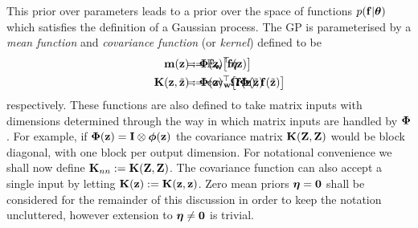This prior over parameters leads to a prior over the space of functions $p(\mathbf{f}|\boldsymbol{\theta})$ which satisfies the definition of a Gaussian process. The GP is parameterised by a \textit{mean function} and \textit{covariance function} (or \textit{kernel}) defined to be
\begin{align}
\bmm(\bz) &:= \EE_{\bw}\big[\bff(\bz)\big] &&
\!\!\!\!\!\!\!\!\!\!\!\!\!\!\!\!\!\!\!\!\!\!\!\!\!\!\!\!\!\!\!\!\!\!\!\!\!\!\!\!\!\!\!\!\!\!\!\!\!\!\!\!\!\!\!\!\!\!\!\!
= \bPh(\bz)\T\bet \\
\bK(\bz,\tilde\bz) &:= \cov_{\bw}\big[\bff(\bz), \bff(\tilde\bz)\big] &&
\!\!\!\!\!\!\!\!\!\!\!\!\!\!\!\!\!\!\!\!\!\!\!\!\!\!\!\!\!\!\!\!\!\!\!\!\!\!\!\!\!\!\!\!\!\!\!\!\!\!\!\!\!\!\!\!\!\!\!\!
= \bPh(\bz)\T \bOm \bPh(\tilde\bz) \label{eqn:covfunc}
\end{align}
respectively. These functions are also defined to take matrix inputs with dimensions determined through the way in which matrix inputs are handled by $\boldsymbol{\Phi}$. For example, if $\boldsymbol{\Phi}(\mathbf{z}) = \mathbf{I} \otimes \boldsymbol{\phi}(\mathbf{z})$ the covariance matrix $\mathbf{K}(\mathbf{Z},\mathbf{Z})$ would be block diagonal, with one block per output dimension. For notational convenience we shall now define $\mathbf{K}_{nn}:=\mathbf{K}(\mathbf{Z},\mathbf{Z})$. The covariance function can also accept a single input by letting $\mathbf{K}(\mathbf{z}) := \mathbf{K}(\mathbf{z},\mathbf{z})$. Zero mean priors $\boldsymbol{\eta} = \mathbf{0}$ shall be considered for the remainder of this discussion in order to keep the notation uncluttered, however extension to $\boldsymbol{\eta} \neq \mathbf{0}$ is trivial.





